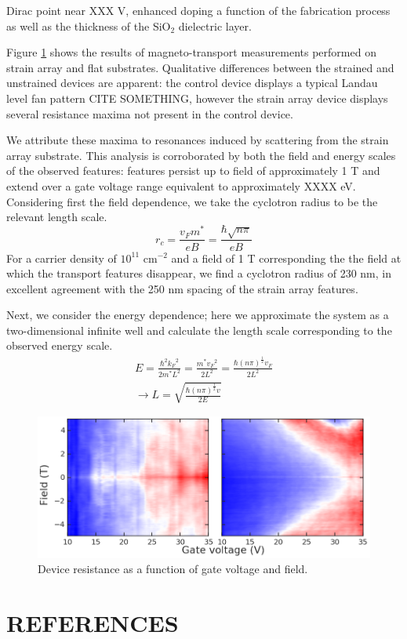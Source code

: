 \documentclass[%
 aip,
 apl,%
 amsmath,amssymb,
 reprint,%
]{revtex4-1}
\begin{document}

Dirac point near XXX V, enhanced doping a function of the fabrication process as well as the thickness of the SiO$_2$ dielectric layer.

Figure \ref{'fig:transport'} shows the results of magneto-transport measurements performed on strain array and flat substrates.
Qualitative differences between the strained and unstrained devices are apparent: the control device displays a typical Landau level
fan pattern CITE SOMETHING, however the strain array device displays several resistance maxima not present in the control device.

We attribute these maxima to resonances induced by scattering from the strain array substrate. This analysis is corroborated by 
both the field and energy scales of the observed features: features persist up to field of approximately 1 T and extend over a
gate voltage range equivalent to approximately XXXX eV. Considering first the field dependence, we take the cyclotron radius
to be the relevant length scale.
\begin{equation}
    r_c = \frac{v_F m^*}{e B} = \frac{\hbar \sqrt{n \pi}}{e B}
\end{equation}
For a carrier density of $10^{11}$ cm$^{-2}$ and a field of 1 T corresponding the the field at which the transport features disappear, 
we find a cyclotron radius of 230 nm, in excellent agreement with the 250 nm spacing of the strain array features.

Next, we consider the energy dependence; here we approximate the system as a two-dimensional infinite well and calculate the length scale corresponding
to the observed energy scale.
\begin{equation}
\begin{split}
    E = \frac{\hbar^2 {k_F}^2}{2 m^* L^2} = \frac{m^* {v_F}^2}{2 L^2} = \frac{\hbar (n \pi)^{\frac{1}{2}} v_F}{2 L^2} \\
    \rightarrow L = \sqrt{\frac{\hbar (n \pi)^{\frac{1}{2}} v}{2 E}}
\end{split}
\end{equation}

\begin{figure}
\centering
\includegraphics[width=1.5\columnwidth]{Figure4}
\caption{Device resistance as a function of gate voltage and field.}
\label{'fig:transport'}
\end{figure}

\section*{REFERENCES}


\end{document}

